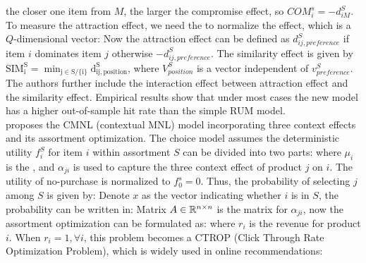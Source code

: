 \documentclass[10pt]{report}
\begin{document}
the closer one item from $M$, the larger the compromise effect, so $COM_i^s=-d_{iM}^S$. 
To measure the attraction effect, we need the  to normalize the effect, which is a $Q$-dimensional vector:
Now the attraction effect can be defined as $d_{ij,preference}^S$ if item $i$ dominates item $j$ otherwise $-d_{ij,preference}^S$. 
The similarity effect is given by $\mathrm{SIM_i^S=\min_{j\in S/\{i\}}d_{ij,position}^S}$, where $V_{position}^S$ is a vector independent of $v_{preference}^S$. 
The authors further include the interaction effect between attraction effect and the similarity effect.
Empirical results show that under most cases the new model has a higher out-of-sample hit rate than the simple RUM model.\\
\cite{yousefi2020choice} proposes the CMNL (contextual MNL) model incorporating three context effects and its assortment optimization. 
The choice model assumes the deterministic utility $f_i^S$ for item $i$ within assortment $S$ can be divided into two parts:
where $\mu_i$ is the , and $\alpha_{ji}$ is used to capture the three context effect of product $j$ on $i$. 
The utility of no-purchase is normalized to $f_0^s=0$. 
Thus, the probability of selecting $j$ among $S$ is given by:
Denote $x$ as the vector indicating whether $i$ is in $S$, the probability can be written in:
Matrix $A\in\RR^{n\times n}$ is the matrix for $\alpha_{ji}$, now the assortment optimization can be formulated as:
where $r_i$ is the revenue for product $i$. 
When $r_i=1,\forall i$, this problem becomes a CTROP (Click Through Rate Optimization Problem), which is widely used in online recommendations:
\end{document}
